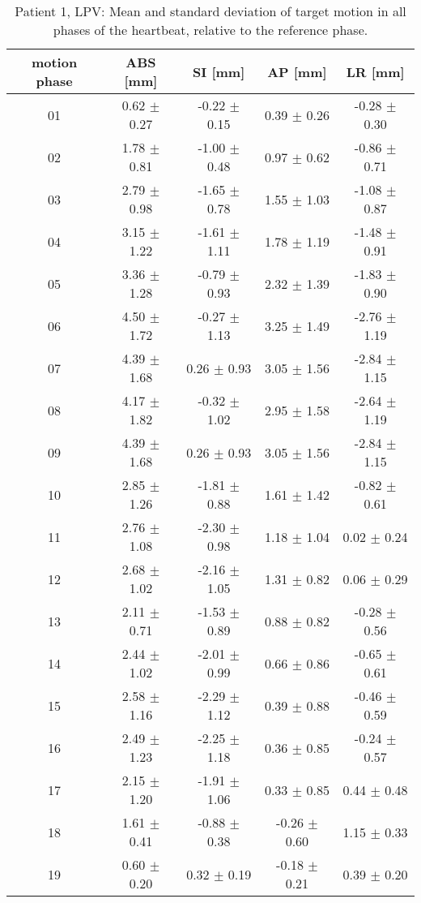 \begin{table}[htbp]
  \centering
  \tiny
  \caption{Patient 1, LPV: Mean and standard deviation of target motion in all phases of the heartbeat, relative to the reference phase.}
  \begin{tabular}{|c|c|c|c|c|}
    \hline\hline
    motion phase\rule{0pt}{2.6ex}\rule[-1.2ex]{0pt}{0pt} & ABS [mm] & SI [mm] & AP [mm] & LR [mm]\\
    \hline 
01& 0.62 $\pm$ 0.27& -0.22 $\pm$ 0.15& 0.39 $\pm$ 0.26& -0.28 $\pm$ 0.30 \\
02& 1.78 $\pm$ 0.81& -1.00 $\pm$ 0.48& 0.97 $\pm$ 0.62& -0.86 $\pm$ 0.71 \\
03& 2.79 $\pm$ 0.98& -1.65 $\pm$ 0.78& 1.55 $\pm$ 1.03& -1.08 $\pm$ 0.87 \\
04& 3.15 $\pm$ 1.22& -1.61 $\pm$ 1.11& 1.78 $\pm$ 1.19& -1.48 $\pm$ 0.91 \\
05& 3.36 $\pm$ 1.28& -0.79 $\pm$ 0.93& 2.32 $\pm$ 1.39& -1.83 $\pm$ 0.90 \\
06& 4.50 $\pm$ 1.72& -0.27 $\pm$ 1.13& 3.25 $\pm$ 1.49& -2.76 $\pm$ 1.19 \\
07& 4.39 $\pm$ 1.68& 0.26 $\pm$ 0.93& 3.05 $\pm$ 1.56& -2.84 $\pm$ 1.15 \\
08& 4.17 $\pm$ 1.82& -0.32 $\pm$ 1.02& 2.95 $\pm$ 1.58& -2.64 $\pm$ 1.19 \\
09& 4.39 $\pm$ 1.68& 0.26 $\pm$ 0.93& 3.05 $\pm$ 1.56& -2.84 $\pm$ 1.15 \\
10& 2.85 $\pm$ 1.26& -1.81 $\pm$ 0.88& 1.61 $\pm$ 1.42& -0.82 $\pm$ 0.61 \\
11& 2.76 $\pm$ 1.08& -2.30 $\pm$ 0.98& 1.18 $\pm$ 1.04& 0.02 $\pm$ 0.24 \\
12& 2.68 $\pm$ 1.02& -2.16 $\pm$ 1.05& 1.31 $\pm$ 0.82& 0.06 $\pm$ 0.29 \\
13& 2.11 $\pm$ 0.71& -1.53 $\pm$ 0.89& 0.88 $\pm$ 0.82& -0.28 $\pm$ 0.56 \\
14& 2.44 $\pm$ 1.02& -2.01 $\pm$ 0.99& 0.66 $\pm$ 0.86& -0.65 $\pm$ 0.61 \\
15& 2.58 $\pm$ 1.16& -2.29 $\pm$ 1.12& 0.39 $\pm$ 0.88& -0.46 $\pm$ 0.59 \\
16& 2.49 $\pm$ 1.23& -2.25 $\pm$ 1.18& 0.36 $\pm$ 0.85& -0.24 $\pm$ 0.57 \\
17& 2.15 $\pm$ 1.20& -1.91 $\pm$ 1.06& 0.33 $\pm$ 0.85& 0.44 $\pm$ 0.48 \\
18& 1.61 $\pm$ 0.41& -0.88 $\pm$ 0.38& -0.26 $\pm$ 0.60& 1.15 $\pm$ 0.33 \\
19& 0.60 $\pm$ 0.20& 0.32 $\pm$ 0.19& -0.18 $\pm$ 0.21& 0.39 $\pm$ 0.20 \\
    \hline\hline
  \end{tabular}
\end{table}


